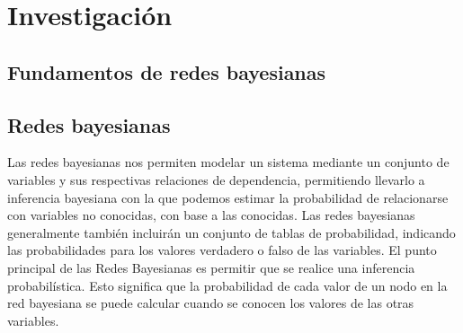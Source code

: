 \section{Investigación}

\subsection{Fundamentos de redes bayesianas}


\subsection*{Redes bayesianas}
Las redes bayesianas nos permiten modelar un sistema mediante un conjunto de variables y sus respectivas relaciones de dependencia, permitiendo llevarlo a inferencia bayesiana con la que podemos estimar la probabilidad de relacionarse con variables no conocidas, con base a las conocidas. Las redes bayesianas generalmente también incluirán un conjunto de tablas de probabilidad, indicando las probabilidades para los valores verdadero o falso de las variables. 
El punto principal de las Redes Bayesianas es permitir que se realice una inferencia probabilística. Esto significa que la probabilidad de cada valor de un nodo en la red bayesiana se puede calcular cuando se conocen los valores de las otras variables.


